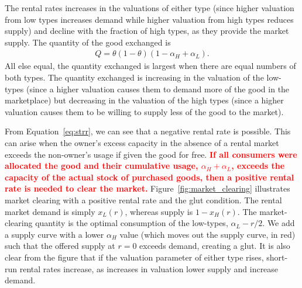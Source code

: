 \documentclass[11pt]{article}
\newcommand{\important}[1]{\textcolor{red}{\textbf{#1}}}
\newcommand{\important}[1]{#1}
\begin{document}
The rental rates increases in the valuations of either type (since higher valuation from low types increases demand while higher valuation from high types reduces supply) and decline with the fraction of high types, as they provide the market supply. 
The quantity of the good exchanged is 
\begin{align} \label{eq:qty}
  Q = \theta (1-\theta) \left(1 - \alpha_H + \alpha_L\right).
\end{align} 
All else equal, the quantity exchanged is largest when there are equal numbers of both types.
The quantity exchanged is increasing in the valuation of the low-types (since a higher valuation causes them to demand more of the good in the marketplace) but decreasing in the valuation of the high types (since a higher valuation causes them to be willing to supply less of the good to the market). 

From Equation~\ref{eq:strr}, we can see that a negative rental rate is possible. 
This can arise when the owner's excess capacity in the absence of a rental market exceeds the non-owner's usage if given the good for free.
\important{If all consumers were allocated the good and their cumulative usage, $\alpha_H + \alpha_L$, exceeds the capacity of the actual stock of purchased goods, then a positive rental rate is needed to clear the market.}
Figure~\ref{fig:market_clearing} illustrates market clearing with a positive rental rate and the glut condition. 
The rental market demand is simply $x_L(r)$, whereas supply is $1-x_H(r)$. 
The market-clearing quantity is the optimal consumption of the low-types, $\alpha_L - r/2$. 
We add a supply curve with a lower $\alpha_H$ value (which moves out the supply curve, in red) such that the offered supply at $r = 0$ exceeds demand, creating a glut.  
It is also clear from the figure that if the valuation parameter of either type rises, short-run rental rates increase, as increases in valuation lower supply and increase demand. 
 
\end{document}
